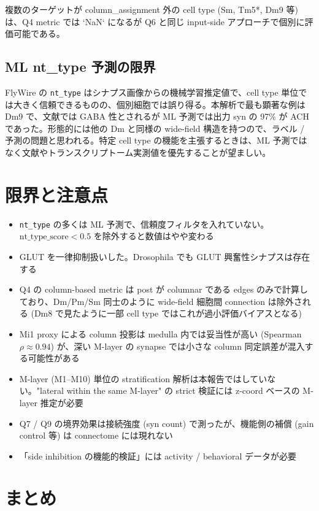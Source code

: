\documentclass[11pt,a4paper]{ltjsarticle}
\begin{document}
複数のターゲットが column\_assignment 外の cell type (Sm, Tm5*, Dm9 等) は、Q4 metric では `NaN` になるが Q6 と同じ input-side アプローチで個別に評価可能である。

\subsection{ML nt\_type 予測の限界}

FlyWire の \texttt{nt\_type} はシナプス画像からの機械学習推定値で、cell type 単位では大きく信頼できるものの、個別細胞では誤り得る。本解析で最も顕著な例は Dm9 で、文献では GABA 性とされるが ML 予測では出力 syn の 97\% が ACH であった。形態的には他の Dm と同様の wide-field 構造を持つので、ラベル / 予測の問題と思われる。特定 cell type の機能を主張するときは、ML 予測ではなく文献やトランスクリプトーム実測値を優先することが望ましい。

\section{限界と注意点}\label{sec:limitations}

\begin{itemize}
\item \texttt{nt\_type} の多くは ML 予測で、信頼度フィルタを入れていない。$\text{nt\_type\_score} < 0.5$ を除外すると数値はやや変わる
\item GLUT を一律抑制扱いした。Drosophila でも GLUT 興奮性シナプスは存在する
\item Q4 の column-based metric は post が columnar である edges のみで計算しており、Dm/Pm/Sm 同士のように wide-field 細胞間 connection は除外される (Dm8 で見たように一部 cell type ではこれが過小評価バイアスとなる)
\item Mi1 proxy による column 投影は medulla 内では妥当性が高い (Spearman $\rho \approx 0.94$) が、深い M-layer の synapse では小さな column 同定誤差が混入する可能性がある
\item M-layer (M1--M10) 単位の stratification 解析は本報告ではしていない。"lateral within the same M-layer" の strict 検証には z-coord ベースの M-layer 推定が必要
\item Q7 / Q9 の境界効果は接続強度 (syn count) で測ったが、機能側の補償 (gain control 等) は connectome には現れない
\item 「side inhibition の機能的検証」には activity / behavioral データが必要
\end{itemize}

\section{まとめ}
\end{document}
